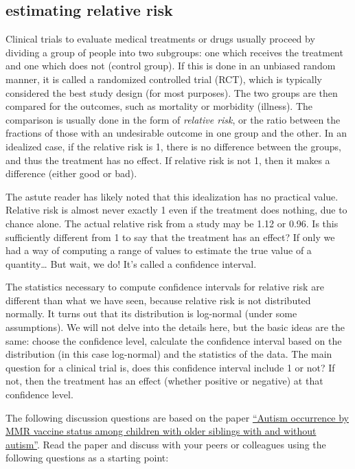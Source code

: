 \documentclass[
  letterpaper,
  DIV=11,
  numbers=noendperiod]{scrreprt}
\begin{document}
\hypertarget{estimating-relative-risk}{%
\subsection{estimating relative risk}\label{estimating-relative-risk}}

Clinical trials to evaluate medical treatments or drugs usually proceed
by dividing a group of people into two subgroups: one which receives the
treatment and one which does not (control group). If this is done in an
unbiased random manner, it is called a randomized controlled trial
(RCT), which is typically considered the best study design (for most
purposes). The two groups are then compared for the outcomes, such as
mortality or morbidity (illness). The comparison is usually done in the
form of \emph{relative risk}, or the ratio between the fractions of
those with an undesirable outcome in one group and the other. In an
idealized case, if the relative risk is 1, there is no difference
between the groups, and thus the treatment has no effect. If relative
risk is not 1, then it makes a difference (either good or bad).

The astute reader has likely noted that this idealization has no
practical value. Relative risk is almost never exactly 1 even if the
treatment does nothing, due to chance alone. The actual relative risk
from a study may be 1.12 or 0.96. Is this sufficiently different from 1
to say that the treatment has an effect? If only we had a way of
computing a range of values to estimate the true value of a
quantity\ldots{} But wait, we do! It's called a confidence interval.

The statistics necessary to compute confidence intervals for relative
risk are different than what we have seen, because relative risk is not
distributed normally. It turns out that its distribution is log-normal
(under some assumptions). We will not delve into the details here, but
the basic ideas are the same: choose the confidence level, calculate the
confidence interval based on the distribution (in this case log-normal)
and the statistics of the data. The main question for a clinical trial
is, does this confidence interval include 1 or not? If not, then the
treatment has an effect (whether positive or negative) at that
confidence level.

The following discussion questions are based on the paper
\href{https://jamanetwork.com/journals/jama/fullarticle/2275444}{``Autism
occurrence by MMR vaccine status among children with older siblings with
and without autism''}. Read the paper and discuss with your peers or
colleagues using the following questions as a starting point:
\end{document}
